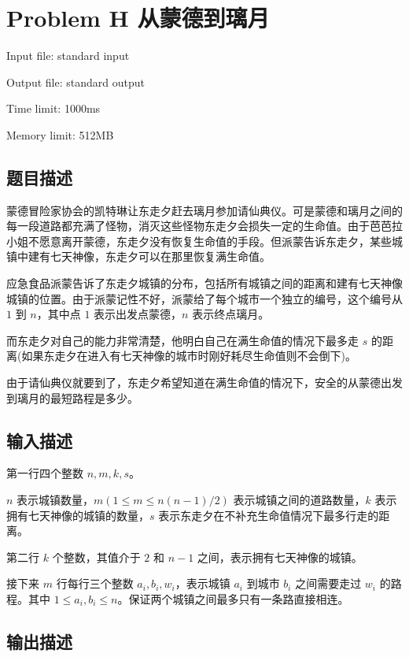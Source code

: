 \newpage
\section{Problem H 从蒙德到璃月}
{ \limitfont{}
Input file: standard input \par
Output file: standard output \par
Time limit: 1000ms \par
Memory limit: 512MB \par
}
\subsection*{题目描述}

蒙德冒险家协会的凯特琳让东走夕赶去璃月参加请仙典仪。可是蒙德和璃月之间的每一段道路都充满了怪物，消灭这些怪物东走夕会损失一定的生命值。由于芭芭拉小姐不愿意离开蒙德，东走夕没有恢复生命值的手段。但派蒙告诉东走夕，某些城镇中建有七天神像，东走夕可以在那里恢复满生命值。

应急食品派蒙告诉了东走夕城镇的分布，包括所有城镇之间的距离和建有七天神像城镇的位置。由于派蒙记性不好，派蒙给了每个城市一个独立的编号，这个编号从 $1$ 到 $n$，其中点 $1$ 表示出发点蒙德，$n$ 表示终点璃月。

而东走夕对自己的能力非常清楚，他明白自己在满生命值的情况下最多走 $s$ 的距离(如果东走夕在进入有七天神像的城市时刚好耗尽生命值则不会倒下)。

由于请仙典仪就要到了，东走夕希望知道在满生命值的情况下，安全的从蒙德出发到璃月的最短路程是多少。

\subsection*{输入描述}

第一行四个整数 $n,m,k,s$。

$n$ 表示城镇数量，$m(1 \leq m \leq n(n-1)/2 )$ 表示城镇之间的道路数量，$k$ 表示拥有七天神像的城镇的数量，$s$ 表示东走夕在不补充生命值情况下最多行走的距离。

第二行 $k$ 个整数，其值介于 $2$ 和 $n-1$ 之间，表示拥有七天神像的城镇。

接下来 $m$ 行每行三个整数 $a_i,b_i,w_i$，表示城镇 $a_i$ 到城市 $b_i$ 之间需要走过 $w_i$ 的路程。其中 $1 \leq a_i,b_i \leq n$。保证两个城镇之间最多只有一条路直接相连。

\subsection*{输出描述}

